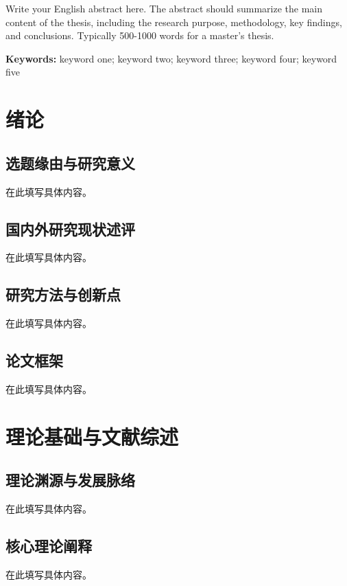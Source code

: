\documentclass[a4paper,12pt,openright]{ctexrep}
\begin{document}
Write your English abstract here. The abstract should summarize the main content of the thesis, including the research purpose, methodology, key findings, and conclusions. Typically 500-1000 words for a master's thesis.

\vspace{1cm}
\noindent\textbf{Keywords:} keyword one; keyword two; keyword three; keyword four; keyword five

\newpage
\tableofcontents


\newpage


\chapter{绪论}
\section{选题缘由与研究意义}
在此填写具体内容。

\section{国内外研究现状述评}
在此填写具体内容。

\section{研究方法与创新点}
在此填写具体内容。

\section{论文框架}
在此填写具体内容。


\chapter{理论基础与文献综述}
\section{理论渊源与发展脉络}
在此填写具体内容。

\section{核心理论阐释}
在此填写具体内容。
\end{document}
